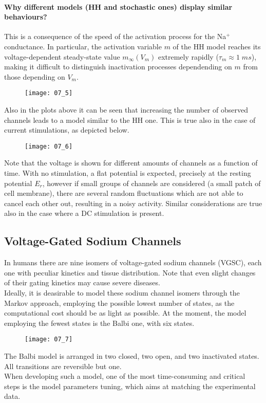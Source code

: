 \paragraph{Why different models (HH and stochastic ones) display similar behaviours?} This is a
consequence of the speed of the activation process for the Na\({}^{+}\) conductance. In particular,
the activation variable \(m\) of the HH model reaches its voltage-dependent steady-state value
\(m_{\infty}(V_{m})\) extremely rapidly (\(\tau_{m}\approx{1\;ms}\)), making it difficult to distinguish
inactivation processes dependending on \(m\) from those depending on \(V_{m}\).
\begin{figure}[H]
    \texttt{[image: 07\_5]}
    \centering
\end{figure}
Also in the plots above it can be seen that increasing the number of observed channels leads to
a model similar to the HH one. This is true also in the case of current stimulations, as depicted below.
\begin{figure}[H]
    \texttt{[image: 07\_6]}
    \centering
\end{figure}
Note that the voltage is shown for different amounts of channels as a function of time. With no stimulation,
a flat potential is expected, precisely at the resting potential \(E_{r}\), however if small groups
of channels are considered (a small patch of cell membrane), there are several random fluctuations which
are not able to cancel each other out, resulting in a noisy activity. Similar considerations are true also
in the case where a DC stimulation is present.

\subsection{Voltage-Gated Sodium Channels}
In humans there are nine isomers of voltage-gated sodium channels (VGSC), each one with peculiar kinetics
and tissue distribution. Note that even slight changes of their gating kinetics may cause severe diseases.\\
Ideally, it is deasirable to model these sodium channel isomers through the Markov approach, employing the
possible lowest number of states, as the computational cost should be as light as possible. At the moment,
the model employing the fewest states is the Balbi one, with six states.
\begin{figure}[H]
    \texttt{[image: 07\_7]}
    \centering
\end{figure}
The Balbi model is arranged in two closed, two open, and two inactivated states. All transitions are
reversible but one.\\
When developing such a model, one of the most time-consuming and critical steps is the model
parameters tuning, which aims at matching the experimental data.